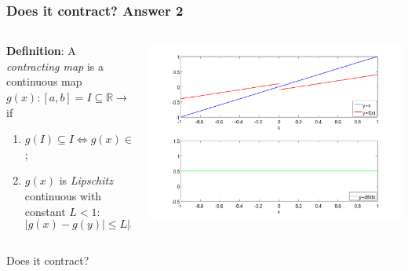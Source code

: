 \documentclass{beamer}
\begin{document}
\begin{frame}
\frametitle{Does it contract? Answer 2}

\begin{columns}
    \begin{column}{0.45\textwidth}
  {\bf Definition}: A \emph{contracting map} is a continuous map
  $g(x) : [a, b] = I \subseteq \mathbb{R} \rightarrow \mathbb{R}$ if
\begin{enumerate}
  \item $g(I) \subseteq I \Leftrightarrow g(x) \in I \, \, \, \forall
    x \in I$;
  \item $g(x)$ is \emph{Lipschitz} continuous with constant $L < 1$:
    \begin{equation*}
      | g(x) - g(y) | \leq L | x - y | \, \, \, \forall x, y \in I.
    \end{equation*}
  \end{enumerate}
\end{column}
\begin{column}{0.55\textwidth}
  \begin{center}
   \includegraphics[width=\textwidth]{figures/cmap3}
  \end{center}
\end{column}
\end{columns}
\begin{overlayarea}{\textwidth}{0.1\textheight}
Does it contract?  
\end{overlayarea}
\end{frame}
\end{document}
